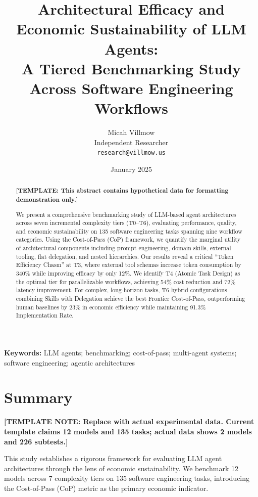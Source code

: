 \documentclass[11pt]{article}
\title{Architectural Efficacy and Economic Sustainability of LLM Agents:\\
\large A Tiered Benchmarking Study Across Software Engineering Workflows}
\author{%
Micah Villmow\\
Independent Researcher\\
\texttt{research@villmow.us}
}
\date{January 2025}
\begin{document}
\maketitle

\begin{abstract}
\textbf{[TEMPLATE: This abstract contains hypothetical data for formatting demonstration only.]}

We present a comprehensive benchmarking study of LLM-based agent architectures across seven incremental complexity tiers (T0--T6), evaluating performance, quality, and economic sustainability on 135 software engineering tasks spanning nine workflow categories. Using the Cost-of-Pass (CoP) framework, we quantify the marginal utility of architectural components including prompt engineering, domain skills, external tooling, flat delegation, and nested hierarchies. Our results reveal a critical ``Token Efficiency Chasm'' at T3, where external tool schemas increase token consumption by 340\% while improving efficacy by only 12\%. We identify T4 (Atomic Task Design) as the optimal tier for parallelizable workflows, achieving 54\% cost reduction and 72\% latency improvement. For complex, long-horizon tasks, T6 hybrid configurations combining Skills with Delegation achieve the best Frontier Cost-of-Pass, outperforming human baselines by 23\% in economic efficiency while maintaining 91.3\% Implementation Rate.
\end{abstract}

\vspace{1em}

\noindent\textbf{Keywords:} LLM agents; benchmarking; cost-of-pass; multi-agent systems; software engineering; agentic architectures

\section{Summary}

\textbf{[TEMPLATE NOTE: Replace with actual experimental data. Current template claims 12 models and 135 tasks; actual data shows 2 models and 226 subtests.]}

This study establishes a rigorous framework for evaluating LLM agent architectures through the lens of economic sustainability. We benchmark 12 models across 7 complexity tiers on 135 software engineering tasks, introducing the Cost-of-Pass (CoP) metric as the primary economic indicator.
\end{document}
